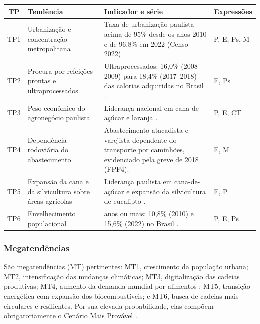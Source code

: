 \documentclass[
	12pt,				%
	openright,			%
	oneside,			%
	a4paper,			%
	chapter=TITLE,		%
	section=TITLE,		%
	english,			%
	french,				%
	spanish,			%
	brazil,				%
 ]{abntex2}
\begin{document}
\begin{quadro}[!htbp]
\centering
\caption{Tendências de peso, evidências e Expressões do Poder}
\label{qua:tendencias-peso-poder}
\footnotesize
\renewcommand{\arraystretch}{1.05}
\setlength{\tabcolsep}{3pt}
\begin{tabularx}{\textwidth}{|c|>{\raggedright\arraybackslash}p{4.0cm}|>{\raggedright\arraybackslash}X|>{\centering\arraybackslash}p{1.85cm}|}
\hline
\textbf{TP} & \textbf{Tendência} & \textbf{Indicador e série} & \textbf{Expressões} \\
\hline
TP1 & Urbanização e concentração metropolitana & Taxa de urbanização paulista acima de 95\% desde os anos 2010 e de 96,8\% em 2022 (Censo 2022) \cite{baptistella2026} & P, E, Ps, M \\
\hline
TP2 & Procura por refeições prontas e ultraprocessados & Ultraprocessados: 16,0\% (2008--2009) para 18,4\% (2017--2018) das calorias adquiridas no Brasil \cite{ibge_pof_2018}. & E, Ps \\
\hline
TP3 & Peso econômico do agronegócio paulista & Liderança nacional em cana-de-açúcar e laranja \cite{iea_sp_2023}. & P, E, CT \\
\hline
TP4 & Dependência rodoviária do abastecimento & Abastecimento atacadista e varejista dependente do transporte por caminhões, evidenciado pela greve de 2018 (FPF4). & E, M \\
\hline
TP5 & Expansão da cana e da silvicultura sobre áreas agrícolas & Liderança paulista em cana-de-açúcar e expansão da silvicultura de eucalipto \cite{iea_sp_2023}. & E, P \\
\hline
TP6 & Envelhecimento populacional & 60 anos ou mais: 10,8\% (2010) e 15,6\% (2022) no Brasil \cite{ibge_censo2022}. & P, E, Ps \\
\hline
\end{tabularx}
\end{quadro}

\subsubsection{Megatendências}
São megatendências (MT) pertinentes: MT1, crescimento da população urbana;
MT2, intensificação das mudanças climáticas; MT3, digitalização das cadeias
produtivas; MT4, aumento da demanda mundial por alimentos \cite{fao_sofi2025};
MT5, transição energética com expansão dos biocombustíveis; e MT6, busca de
cadeias mais circulares e resilientes. Por sua elevada probabilidade, elas
compõem obrigatoriamente o Cenário Mais Provável \cite[p. 48, 102]{esg_mpe2026}.
\end{document}

